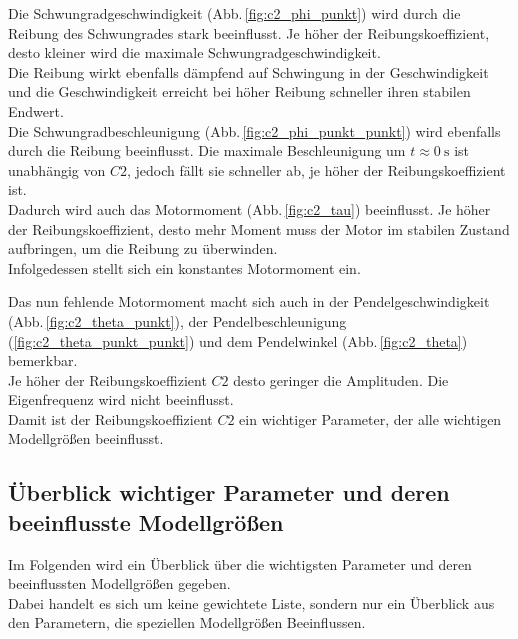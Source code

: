 Die Schwungradgeschwindigkeit (Abb.\,\ref{fig:c2_phi_punkt}) wird durch die Reibung des Schwungrades stark beeinflusst. Je höher der Reibungskoeffizient, desto kleiner wird die maximale Schwungradgeschwindigkeit.\\
Die Reibung wirkt ebenfalls dämpfend auf Schwingung in der Geschwindigkeit und die Geschwindigkeit erreicht bei höher Reibung schneller ihren stabilen Endwert.\\

Die Schwungradbeschleunigung (Abb.\,\ref{fig:c2_phi_punkt_punkt}) wird ebenfalls durch die Reibung beeinflusst. Die maximale Beschleunigung um $t\approx\SI{0}{\s}$ ist unabhängig von $C2$, jedoch fällt sie schneller ab, je höher der Reibungskoeffizient ist.\\

Dadurch wird auch das Motormoment (Abb.\,\ref{fig:c2_tau}) beeinflusst. Je höher der Reibungskoeffizient, desto mehr Moment muss der Motor im stabilen Zustand aufbringen, um die Reibung zu überwinden.\\
Infolgedessen stellt sich ein konstantes Motormoment ein.

Das nun fehlende Motormoment macht sich auch in der Pendelgeschwindigkeit (Abb.\,\ref{fig:c2_theta_punkt}), der Pendelbeschleunigung (\ref{fig:c2_theta_punkt_punkt}) und dem Pendelwinkel (Abb.\,\ref{fig:c2_theta}) bemerkbar.\\
Je höher der Reibungskoeffizient $C2$ desto geringer die Amplituden.
Die Eigenfrequenz wird nicht beeinflusst.\\

Damit ist der Reibungskoeffizient $C2$ ein wichtiger Parameter, der alle wichtigen Modellgrößen beeinflusst.
\pagebreak
\subsection*{Überblick wichtiger Parameter und deren beeinflusste Modellgrößen}
Im Folgenden wird ein Überblick über die wichtigsten Parameter und deren beeinflussten Modellgrößen gegeben.\\
Dabei handelt es sich um keine gewichtete Liste, sondern nur ein Überblick aus den Parametern, die speziellen Modellgrößen Beeinflussen.


